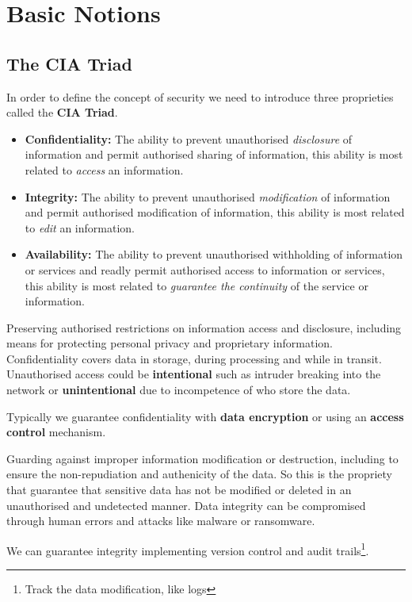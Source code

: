 \section{Basic Notions}
    \subsection{The CIA Triad}
    In order to define the concept of security we need to introduce three proprieties called the \textbf{CIA Triad}.
    \begin{itemize}
        \item \textbf{Confidentiality:} The ability to prevent unauthorised \textit{disclosure} of information and permit authorised sharing of information, this ability is most related to \textit{access} an information.
        \item \textbf{Integrity:} The ability to prevent unauthorised \textit{modification} of information and permit authorised modification of information, this ability is most related to \textit{edit} an information.
        \item \textbf{Availability:} The ability to prevent unauthorised withholding of information or services and readly permit authorised access to information or services, this ability is most related to \textit{guarantee the continuity} of the service or information.
    \end{itemize}
    
    Preserving authorised restrictions on information access and disclosure, including means for protecting personal privacy and proprietary information. Confidentiality covers data in storage, during processing and while in transit. Unauthorised access could be \textbf{intentional} such as intruder breaking into the network or \textbf{unintentional} due to incompetence of who store the data. 
    
    Typically we guarantee confidentiality with \textbf{data encryption} or using an \textbf{access control} mechanism.
    
    Guarding against improper information modification or destruction, including to ensure the non-repudiation and authenicity of the data. So this is the propriety that guarantee that sensitive data has not be modified or deleted in an unauthorised and undetected manner. Data integrity can be compromised through human errors and attacks like malware or ransomware.
    
    We can guarantee integrity implementing version control and audit trails\footnote{Track the data modification, like logs}.
    
